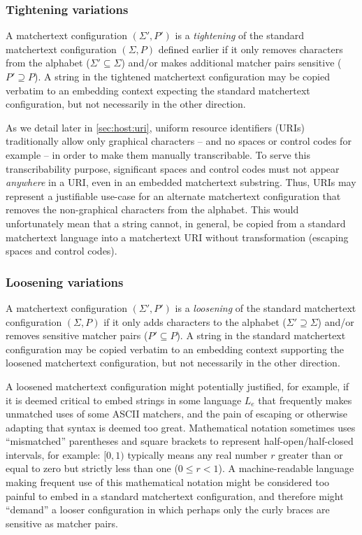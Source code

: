 \subsubsection{Tightening variations}
\label{sec:design:concrete:variations:tight}

A matchertext configuration $(\Sigma',P')$
is a \emph{tightening} of
the standard matchertext configuration $(\Sigma,P)$ defined earlier
if it only removes characters from the alphabet ($\Sigma' \subseteq \Sigma$)
and/or makes additional matcher pairs sensitive ($P' \supseteq P$).
A string in the tightened matchertext configuration
may be copied verbatim to an embedding context
expecting the standard matchertext configuration,
but not necessarily in the other direction.

As we detail later in \cref{sec:host:uri},
uniform resource identifiers (URIs)~\cite{rfc3986} traditionally allow
only graphical characters -- and no spaces or control codes for example --
in order to make them manually transcribable.
To serve this transcribability purpose,
significant spaces and control codes must not appear \emph{anywhere} in a URI,
even in an embedded matchertext substring.
Thus, URIs may represent a justifiable use-case
for an alternate matchertext configuration that removes
the non-graphical characters from the alphabet.
This would unfortunately mean that a string cannot, in general,
be copied from a standard matchertext language into a matchertext URI
without transformation (\ie escaping spaces and control codes).

\subsubsection{Loosening variations}

A matchertext configuration $(\Sigma',P')$
is a \emph{loosening} of
the standard matchertext configuration $(\Sigma,P)$
if it only adds characters to the alphabet ($\Sigma' \supseteq \Sigma$)
and/or removes sensitive matcher pairs ($P' \subseteq P$).
A string in the standard matchertext configuration
may be copied verbatim to an embedding context
supporting the loosened matchertext configuration,
but not necessarily in the other direction.

A loosened matchertext configuration might potentially justified,
for example, if it is deemed critical to embed strings in some language $L_e$
that frequently makes unmatched uses of some ASCII matchers,
and the pain of escaping or otherwise adapting that syntax is deemed too great.
Mathematical notation sometimes uses
``mismatched'' parentheses and square brackets
to represent half-open/half-closed intervals, for example:
\eg $[0,1)$ typically means any real number $r$ greater than or equal to zero
but strictly less than one ($0 \le r < 1$).
A machine-readable language making frequent use of this mathematical notation
might be considered too painful to embed
in a standard matchertext configuration,
and therefore might ``demand'' a looser configuration
in which perhaps only the curly braces are sensitive as matcher pairs.

